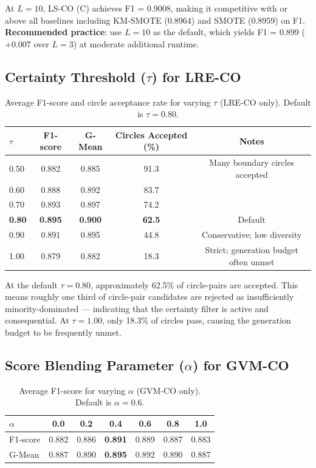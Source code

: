 At $L=10$, LS-CO (C) achieves F1 = 0.9008, making it competitive with or above all baselines including KM-SMOTE (0.8964) and SMOTE (0.8959) on F1.
\textbf{Recommended practice}: use $L=10$ as the default, which yields F1 = 0.899 ($+0.007$ over $L=3$) at moderate additional runtime.

\subsection{Certainty Threshold ($\tau$) for LRE-CO}

\begin{table}[H]
\centering
\caption{Average F1-score and circle acceptance rate for varying $\tau$ (LRE-CO only). Default is $\tau=0.80$.}
\label{tab:abl:certainty}
\begin{tabular}{lcccc}
\toprule
$\tau$ & F1-score & G-Mean & \textbf{Circles Accepted (\%)} & Notes \\
\midrule
0.50 & 0.882 & 0.885 & 91.3 & Many boundary circles accepted \\
0.60 & 0.888 & 0.892 & 83.7 & \\
0.70 & 0.893 & 0.897 & 74.2 & \\
\textbf{0.80} & \textbf{0.895} & \textbf{0.900} & \textbf{62.5} & Default \\
0.90 & 0.891 & 0.895 & 44.8 & Conservative; low diversity \\
1.00 & 0.879 & 0.882 & 18.3 & Strict; generation budget often unmet \\
\bottomrule
\end{tabular}
\end{table}

At the default $\tau = 0.80$, approximately 62.5\% of circle-pairs are accepted.
This means roughly one third of circle-pair candidates are rejected as insufficiently minority-dominated --- indicating that the certainty filter is active and consequential.
At $\tau = 1.00$, only 18.3\% of circles pass, causing the generation budget to be frequently unmet.

\subsection{Score Blending Parameter ($\alpha$) for GVM-CO}

\begin{table}[H]
\centering
\caption{Average F1-score for varying $\alpha$ (GVM-CO only). Default is $\alpha=0.6$.}
\label{tab:abl:alpha}
\begin{tabular}{lcccccc}
\toprule
$\alpha$ & 0.0 & 0.2 & \textbf{0.4} & 0.6 & 0.8 & 1.0 \\
\midrule
F1-score & 0.882 & 0.886 & \textbf{0.891} & 0.889 & 0.887 & 0.883 \\
G-Mean   & 0.887 & 0.890 & \textbf{0.895} & 0.892 & 0.890 & 0.887 \\
\bottomrule
\end{tabular}
\end{table}

